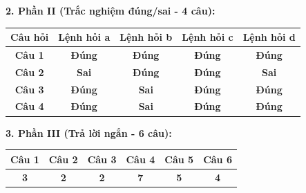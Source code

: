 \documentclass[11pt,a4paper]{article}
\begin{document}
\textbf{\color{myGreen} 2. Phần II (Trắc nghiệm đúng/sai - 4 câu):}
\begin{center}
\begin{tabular}{|c|c|c|c|c|}
\hline
\textbf{Câu hỏi} & \textbf{Lệnh hỏi a} & \textbf{Lệnh hỏi b} & \textbf{Lệnh hỏi c} & \textbf{Lệnh hỏi d} \\
\hline
\textbf{Câu 1} & \textbf{\color{red} Đúng} & \textbf{\color{red} Đúng} & \textbf{\color{red} Đúng} & \textbf{\color{red} Đúng} \\
\hline
\textbf{Câu 2} & \textbf{\color{mySub} Sai} & \textbf{\color{red} Đúng} & \textbf{\color{red} Đúng} & \textbf{\color{mySub} Sai} \\
\hline
\textbf{Câu 3} & \textbf{\color{red} Đúng} & \textbf{\color{mySub} Sai} & \textbf{\color{red} Đúng} & \textbf{\color{red} Đúng} \\
\hline
\textbf{Câu 4} & \textbf{\color{red} Đúng} & \textbf{\color{mySub} Sai} & \textbf{\color{red} Đúng} & \textbf{\color{red} Đúng} \\
\hline
\end{tabular}
\end{center}

\textbf{\color{myGreen} 3. Phần III (Trả lời ngắn - 6 câu):}
\begin{center}
\begin{tabular}{|*{6}{c|}}
\hline
\textbf{Câu 1} & \textbf{Câu 2} & \textbf{Câu 3} & \textbf{Câu 4} & \textbf{Câu 5} & \textbf{Câu 6} \\
\hline
\textbf{\color{red} 3} & \textbf{\color{red} 2} & \textbf{\color{red} 2} & \textbf{\color{red} 7} & \textbf{\color{red} 5} & \textbf{\color{red} 4} \\
\hline
\end{tabular}
\end{center}
\end{document}
